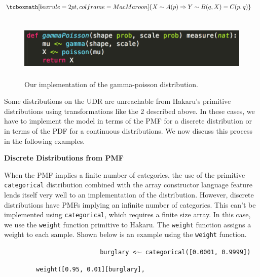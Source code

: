\documentclass[22pt]{beamer}
\newenvironment{variableblock}[3]{%
  \setbeamercolor{block body}{#2}
  \setbeamercolor{block title}{#3}
  \begin{block}{#1}}{\end{block}}
\begin{document}
\begin{frame}[fragile]
\begin{textblock}{5}
\begin{variableblock}{}{}{}
\begin{equation*}
\begin{aligned}
& \tcboxmath[boxrule=2pt,colframe=MacMaroon]{X \sim A(p) \Rightarrow Y \sim B(q, X) = C(p, q)}
\end{aligned}
\end{equation*}

\begin{figure}
\centering
\includegraphics[height=3cm]{gamma-poisson.png}
\caption{\tiny{Our implementation of the gamma-poisson distribution.}}
\end{figure}

\bigskip

Some distributions on the UDR are unreachable from Hakaru's primitive distributions using transformations like the 2 described above. In these cases, we have to implement the model in terms of the PMF for a discrete distribution or in terms of the PDF for a continuous distributions. We now discuss this process in the following examples. 

\small{\textbf{Discrete Distributions from PMF}}

\bigskip

\tiny{When the PMF implies a finite number of categories, the use of the primitive {\tt \tiny{categorical}} distribution combined with the array constructor language feature lends itself very well to an implementation of the distribution. However, discrete distributions have PMFs implying an infinite number of categories. This can’t be implemented using {\tt \tiny{categorical}}, which requires a finite size array. In this case, we use the {\tt \tiny{weight}} function primitive to Hakaru. The {\tt \tiny{weight}} function assigns a weight to each sample. Shown below is an example using the {\tt \tiny{weight}} function.
}

\begin{center}
\justifying
~~~~~~~~~~~~~~~~~~~~~~~~~~\tt{ \small{burglary {\color{green}<$\sim$} {\color{blue}categorical}([{\color{purple}0.0001}, {\color{purple}0.9999}])}}

~~~~~~~~~\tt{\small{{\color{blue}weight}([{\color{purple}0.95}, {\color{purple}0.01}][burglary],}}


\end{center}
\end{variableblock}
\end{textblock}
\end{frame}
\end{document}
